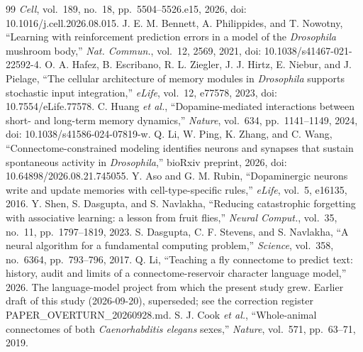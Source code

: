 \documentclass[conference]{IEEEtran}
\begin{document}
\begin{thebibliography}{99}
\textit{Cell}, vol.~189, no.~18, pp.~5504--5526.e15, 2026,
doi: 10.1016/j.cell.2026.08.015.
 J. E. M. Bennett, A. Philippides, and T. Nowotny,
``Learning with reinforcement prediction errors in a model of the
\textit{Drosophila} mushroom body,'' \textit{Nat. Commun.}, vol.~12, 2569,
2021, doi: 10.1038/s41467-021-22592-4.
 O. A. Hafez, B. Escribano, R. L. Ziegler, J. J. Hirtz,
E. Niebur, and J. Pielage, ``The cellular architecture of memory modules in
\textit{Drosophila} supports stochastic input integration,'' \textit{eLife},
vol.~12, e77578, 2023, doi: 10.7554/eLife.77578.
 C. Huang \textit{et al.}, ``Dopamine-mediated interactions
between short- and long-term memory dynamics,'' \textit{Nature}, vol.~634,
pp.~1141--1149, 2024, doi: 10.1038/s41586-024-07819-w.
 Q. Li, W. Ping, K. Zhang, and C. Wang, ``Connectome-constrained
modeling identifies neurons and synapses that sustain spontaneous activity in
\textit{Drosophila},'' bioRxiv preprint, 2026, doi: 10.64898/2026.08.21.745055.
 Y. Aso and G. M. Rubin, ``Dopaminergic neurons write and
update memories with cell-type-specific rules,'' \textit{eLife}, vol.~5,
e16135, 2016.
 Y. Shen, S. Dasgupta, and S. Navlakha, ``Reducing
catastrophic forgetting with associative learning: a lesson from fruit
flies,'' \textit{Neural Comput.}, vol.~35, no.~11, pp.~1797--1819, 2023.
 S. Dasgupta, C. F. Stevens, and S. Navlakha, ``A neural
algorithm for a fundamental computing problem,'' \textit{Science}, vol.~358,
no.~6364, pp.~793--796, 2017.
 Q. Li, ``Teaching a fly connectome to predict text:
history, audit and limits of a connectome-reservoir character language
model,'' 2026. The language-model project from which the
present study grew.
 Earlier draft of this study (2026-09-20), superseded;
see the correction register PAPER\_OVERTURN\_20260928.md.
 S. J. Cook \textit{et al.}, ``Whole-animal connectomes of
both \textit{Caenorhabditis elegans} sexes,'' \textit{Nature}, vol.~571,
pp.~63--71, 2019.
\end{thebibliography}
\end{document}

